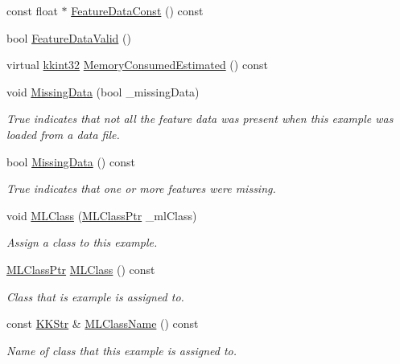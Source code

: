 \begin{DoxyCompactItemize}
const float $\ast$ \hyperlink{class_k_k_m_l_l_1_1_feature_vector_a87f4c34d2bbfdd71343937f273d49aa8}{Feature\+Data\+Const} () const 
\item 
bool \hyperlink{class_k_k_m_l_l_1_1_feature_vector_a80f0e267efb820f6bcf91496675d3e85}{Feature\+Data\+Valid} ()
\item 
virtual \hyperlink{namespace_k_k_b_a8fa4952cc84fda1de4bec1fbdd8d5b1b}{kkint32} \hyperlink{class_k_k_m_l_l_1_1_feature_vector_a92df004ff1d75c70e88582ccaf593bf8}{Memory\+Consumed\+Estimated} () const 
\item 
void \hyperlink{class_k_k_m_l_l_1_1_feature_vector_a6576552806c4833d80013d8e759f76bf}{Missing\+Data} (bool \+\_\+missing\+Data)
\begin{DoxyCompactList}\small\item\em True indicates that not all the feature data was present when this example was loaded from a data file. \end{DoxyCompactList}\item 
bool \hyperlink{class_k_k_m_l_l_1_1_feature_vector_aca4dbddf1e675dccfd37810aab3f6dc3}{Missing\+Data} () const 
\begin{DoxyCompactList}\small\item\em True indicates that one or more features were missing. \end{DoxyCompactList}\item 
void \hyperlink{class_k_k_m_l_l_1_1_feature_vector_a3c8fe002c6e868f8c00059c004fb32fd}{M\+L\+Class} (\hyperlink{namespace_k_k_m_l_l_ac272393853d59e72e8456f14cd6d8c23}{M\+L\+Class\+Ptr} \+\_\+ml\+Class)
\begin{DoxyCompactList}\small\item\em Assign a class to this example. \end{DoxyCompactList}\item 
\hyperlink{namespace_k_k_m_l_l_ac272393853d59e72e8456f14cd6d8c23}{M\+L\+Class\+Ptr} \hyperlink{class_k_k_m_l_l_1_1_feature_vector_a8d5fbfe84e030bb9d37c89b159bb9b75}{M\+L\+Class} () const 
\begin{DoxyCompactList}\small\item\em Class that is example is assigned to. \end{DoxyCompactList}\item 
const \hyperlink{class_k_k_b_1_1_k_k_str}{K\+K\+Str} \& \hyperlink{class_k_k_m_l_l_1_1_feature_vector_a2f4e2e9d2f0a727a2ff2b2f859828b61}{M\+L\+Class\+Name} () const 
\begin{DoxyCompactList}\small\item\em Name of class that this example is assigned to. \end{DoxyCompactList}\item 

\end{DoxyCompactItemize}
